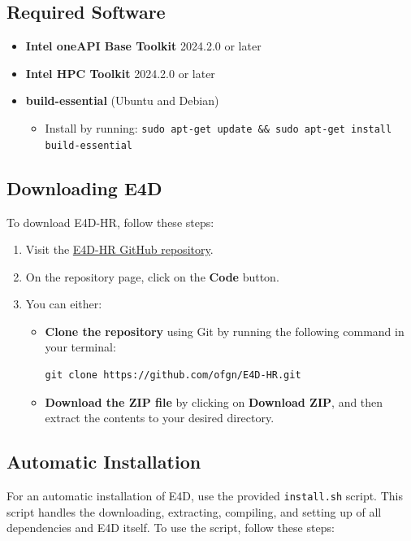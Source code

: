 \documentclass[a4paper,12pt]{article}
\begin{document}
\subsection{Required Software}

\begin{itemize}
    \item \textbf{Intel oneAPI Base Toolkit} 2024.2.0 or later
    \item \textbf{Intel HPC Toolkit} 2024.2.0 or later
    \item \textbf{build-essential} (Ubuntu and Debian)
    \begin{itemize}
        \item Install by running: \texttt{sudo apt-get update \&\& sudo apt-get install build-essential}
    \end{itemize}
\end{itemize}

\subsection{Downloading E4D}

To download E4D-HR, follow these steps:

\begin{enumerate}
    \item Visit the \href{https://github.com/ofgn/E4D-HR}{E4D-HR GitHub repository}.
    \item On the repository page, click on the \textbf{Code} button.
    \item You can either:
    \begin{itemize}
        \item \textbf{Clone the repository} using Git by running the following command in your terminal:
        \begin{verbatim}
git clone https://github.com/ofgn/E4D-HR.git
        \end{verbatim}
        \item \textbf{Download the ZIP file} by clicking on \textbf{Download ZIP}, and then extract the contents to your desired directory.
    \end{itemize}
\end{enumerate}

\subsection{Automatic Installation}

For an automatic installation of E4D, use the provided \texttt{install.sh} script. This script handles the downloading, extracting, compiling, and setting up of all dependencies and E4D itself. To use the script, follow these steps:
\end{document}

